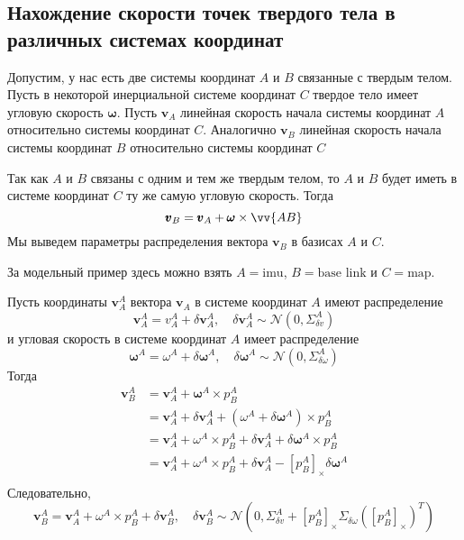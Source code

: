 \documentclass[12pt]{article}
\begin{document}
\subsection{Нахождение скорости точек твердого тела в различных системах координат}

Допустим, у нас есть две системы координат $A$ и $B$ связанные с твердым телом.
Пусть в некоторой инерциальной системе координат $C$ твердое тело имеет
угловую скорость $\pmb{\omega}$. Пусть $\pmb{v}_A$ линейная
скорость начала системы координат $A$ относительно системы координат $C$.
Аналогично $\pmb{v}_B$ линейная скорость начала системы координат $B$
относительно системы координат $C$

Так как $A$ и $B$ связаны с одним
и тем же твердым телом, то $A$ и $B$ будет иметь в системе координат $C$ ту же
самую угловую скорость. Тогда
\begin{equation}
    \pmb{v}_B=\pmb{v}_A+\pmb{\omega} \times \vv{AB}
\end{equation}
Мы выведем параметры распределения вектора $\pmb{v}_B$ в базисах
$A$ и $C$.

За модельный пример здесь можно взять $A=\mbox{imu}$, $B=\mbox{base link}$
и $C=\mbox{map}$.

Пусть координаты $\pmb{v}_A^A$ вектора $\pmb{v}_A$ в системе координат $A$ имеют
распределение
$$
    \pmb{v}_A^A=v_A^A+\delta \pmb{v}_A^A,
    \quad
    \delta \pmb{v}_A^A \sim \mathcal{N}(0, \Sigma_{\delta v}^A)
$$
и угловая скорость в системе координат $A$ имеет распределение
$$
    \pmb{\omega}^A=\omega^A+\delta \pmb{\omega}^A,
    \quad
    \delta \pmb{\omega}^A\sim \mathcal{N}(0, \Sigma_{\delta \omega}^A)
$$
Тогда
$$
    \begin{aligned}
        \pmb{v}_B^A
         & =\pmb{v}_A^A+\pmb{\omega}^A \times p_B^A                 \\
         & =\pmb{v}_A^A+\delta \pmb{v}_A^A
        + (\omega^A+\delta \pmb{\omega}^A) \times p_B^A             \\
         & =\pmb{v}_A^A+ \omega^A\times p_B^A
        + \delta \pmb{v}_A^A + \delta \pmb{\omega}^A \times p_B^A   \\
         & =\pmb{v}_A^A+ \omega^A\times p_B^A
        + \delta \pmb{v}_A^A - [p_B^A]_\times \delta \pmb{\omega}^A \\
    \end{aligned}
$$
Следовательно,
\begin{equation}
    \pmb{v}_B^A=\pmb{v}_A^A+ \omega^A\times p_B^A+\delta \pmb{v}_B^A,
    \quad
    \delta \pmb{v}_B^A\sim\mathcal{N}(
    0,
    \Sigma_{\delta v}^A
    + [p_B^A]_\times \Sigma_{\delta\omega} ([p_B^A]_\times)^T
    )
\end{equation}
\end{document}
